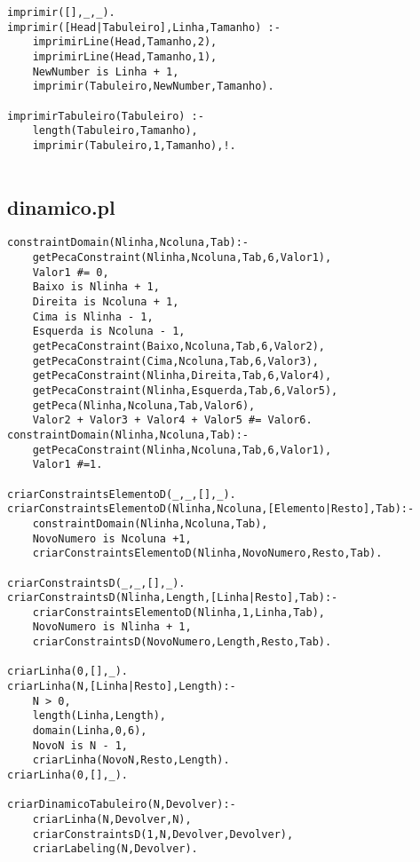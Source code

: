 \documentclass[runningheads]{llncs}
\begin{document}
\begin{lstlisting}
imprimir([],_,_).
imprimir([Head|Tabuleiro],Linha,Tamanho) :-
    imprimirLine(Head,Tamanho,2),
    imprimirLine(Head,Tamanho,1),
    NewNumber is Linha + 1,
    imprimir(Tabuleiro,NewNumber,Tamanho).

imprimirTabuleiro(Tabuleiro) :-
    length(Tabuleiro,Tamanho),
    imprimir(Tabuleiro,1,Tamanho),!.
    
   \end{lstlisting}

\subsection{dinamico.pl}
\begin{lstlisting}
constraintDomain(Nlinha,Ncoluna,Tab):-
    getPecaConstraint(Nlinha,Ncoluna,Tab,6,Valor1),
    Valor1 #= 0,
    Baixo is Nlinha + 1,
    Direita is Ncoluna + 1,
    Cima is Nlinha - 1,
    Esquerda is Ncoluna - 1,
    getPecaConstraint(Baixo,Ncoluna,Tab,6,Valor2),
    getPecaConstraint(Cima,Ncoluna,Tab,6,Valor3),
    getPecaConstraint(Nlinha,Direita,Tab,6,Valor4),
    getPecaConstraint(Nlinha,Esquerda,Tab,6,Valor5),
    getPeca(Nlinha,Ncoluna,Tab,Valor6),
    Valor2 + Valor3 + Valor4 + Valor5 #= Valor6.
constraintDomain(Nlinha,Ncoluna,Tab):-
    getPecaConstraint(Nlinha,Ncoluna,Tab,6,Valor1),
    Valor1 #=1.

criarConstraintsElementoD(_,_,[],_).
criarConstraintsElementoD(Nlinha,Ncoluna,[Elemento|Resto],Tab):-
    constraintDomain(Nlinha,Ncoluna,Tab),
    NovoNumero is Ncoluna +1,
    criarConstraintsElementoD(Nlinha,NovoNumero,Resto,Tab).

criarConstraintsD(_,_,[],_).
criarConstraintsD(Nlinha,Length,[Linha|Resto],Tab):-
    criarConstraintsElementoD(Nlinha,1,Linha,Tab),
    NovoNumero is Nlinha + 1,
    criarConstraintsD(NovoNumero,Length,Resto,Tab).

criarLinha(0,[],_).
criarLinha(N,[Linha|Resto],Length):-
    N > 0,
    length(Linha,Length),
    domain(Linha,0,6),
    NovoN is N - 1,
    criarLinha(NovoN,Resto,Length).
criarLinha(0,[],_).

criarDinamicoTabuleiro(N,Devolver):-
    criarLinha(N,Devolver,N),
    criarConstraintsD(1,N,Devolver,Devolver),
    criarLabeling(N,Devolver).
\end{lstlisting}
\end{document}
